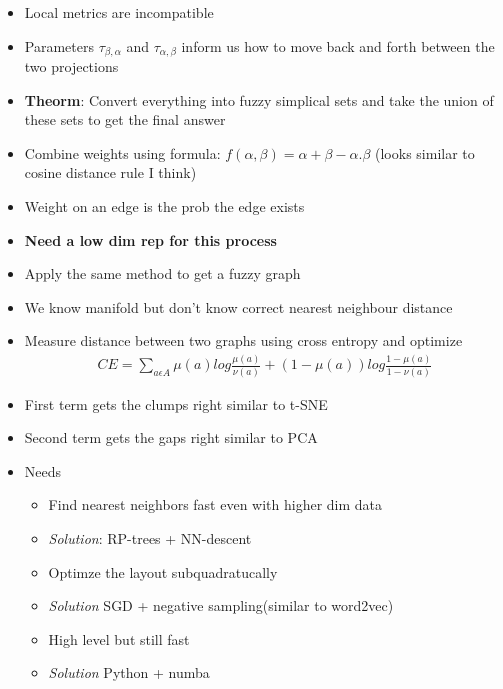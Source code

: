 \documentclass[a4paper]{article}
\begin{document}
\begin{itemize}
\begin{itemize}
            \item  Local metrics are incompatible
            \item Parameters $\tau_{\beta, \alpha}$ and $\tau_{\alpha, \beta}$ inform us how to move back and forth between the two projections
            \item \textbf{Theorm}: Convert everything into fuzzy simplical sets and take the union of these sets to get the final answer
            \item Combine weights using formula:
                $f(\alpha, \beta) = \alpha + \beta - \alpha . \beta$ (looks similar to cosine distance rule I think)
            \item Weight on an edge is the prob the edge exists
            \item \textbf{Need a low dim rep for this process}  
            \item Apply the same method to get a fuzzy graph
            \item We know manifold but don't know correct nearest neighbour distance
            \item Measure distance between two graphs using cross entropy and optimize
                \begin{equation}
                    \begin{split}
                        CE = \sum_{a \epsilon A} \mu(a)log \frac{\mu(a)}{\nu(a)} + (1 - \mu(a)) log \frac{1-\mu(a)}{1-\nu(a)} 
                    \end{split}
                \end{equation}
            \item First term gets the clumps right similar to t-SNE
            \item Second term gets the gaps right similar to PCA
            \item Needs
                \begin{itemize}
                    \item Find nearest neighbors fast even with higher dim data
                    \item \textit{Solution}: RP-trees + NN-descent
                    \item Optimze the layout subquadratucally
                    \item \textit{Solution} SGD + negative sampling(similar to word2vec)
                    \item High level but still fast
                    \item \textit{Solution} Python + numba
                \end{itemize}
        \end{itemize}
\end{itemize}
\end{document}

